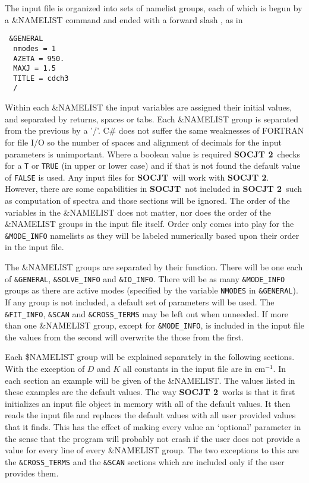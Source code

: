 \documentclass{article}
\newcommand{\wn}{cm$^{-1}$}
\newcommand{\socjttwo}{{\bf SOCJT 2}}
\newcommand{\socjt}{{\bf SOCJT}}
\begin{document}
The input file is organized into sets of namelist groups, each of
which is begun by a \&NAMELIST command and ended with a forward slash
\/, as in 
\begin{verbatim}
 &GENERAL 
  nmodes = 1
  AZETA = 950.
  MAXJ = 1.5
  TITLE = cdch3 
  /
\end{verbatim}
Within each \&NAMELIST the input variables are assigned their initial
values, and separated by returns, spaces or tabs. Each \&NAMELIST group is separated from
the previous by a '/'. C\# does not suffer the same weaknesses of FORTRAN for file I/O
so the number of spaces and alignment of decimals for the input parameters is unimportant.
Where a boolean value is required \socjttwo\ checks for a {\tt T} or {\tt TRUE} (in upper or lower case)
and if that is not found the default value of {\tt FALSE} is used. Any input files for \socjt\ will work
with \socjttwo. However, there are some capabilities in \socjt\ not included in \socjttwo\ such as 
computation of spectra and those sections will be ignored. The order of the variables in
the \&NAMELIST does not matter, nor does the order of the \&NAMELIST
groups in the input file itself. Order only comes into play for the {\tt \&MODE\_INFO} namelists as they will be labeled numerically based upon their order in the input file.

The \&NAMELIST groups are separated by their function. There will be one each of
{\tt \&GENERAL}, {\tt \&SOLVE\_INFO} and {\tt \&IO\_INFO}. There will be as many {\tt \&MODE\_INFO} groups as there are active modes
(specified by the variable {\tt NMODES}  in {\tt \&GENERAL}). If any group is not included,
a default set of parameters will be used. The {\tt \&FIT\_INFO}, {\tt \&SCAN} and {\tt \&CROSS\_TERMS} 
may be left out when unneeded. If more than one
\&NAMELIST group, except for {\tt \&MODE\_INFO}, is included in the input file the values from the second will overwrite the those from the first. 

Each \$NAMELIST group will be explained separately in the following sections. With the exception of $D$ and $K$ all constants in the input file are in \wn. In each section an example will be given of the \&NAMELIST. The values listed in these examples are the default values. The way \socjttwo\ works is that it first initializes an input file object in memory with all of the default values. It then reads the input file and replaces the default values with all user provided values that it finds. This has the effect of making every value an `optional' parameter in the sense that the program will probably not crash if the user does not provide a value for every line of every \&NAMELIST group. The two exceptions to this are the {\tt\&CROSS\_TERMS} and the {\tt\&SCAN} sections which are included only if the user provides them.
\end{document}
